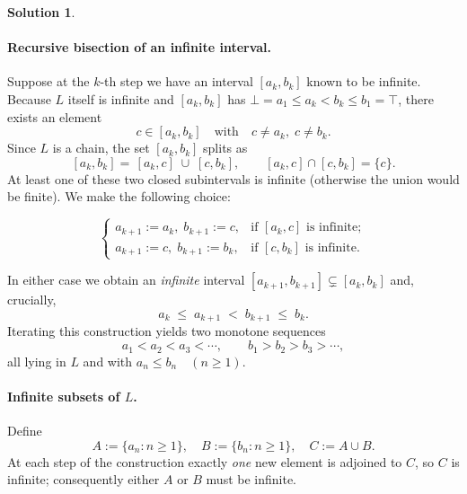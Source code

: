 \documentclass[12pt]{article}
\theoremstyle{definition} %
\newtheorem{solution}{Solution}
\theoremstyle{plain} %
\begin{document}
\begin{solution}
          \paragraph{Recursive bisection of an infinite interval.}
          Suppose at the $k$-th step we have an interval $[a_{k},b_{k}]$
          known to be infinite.
          Because $L$ itself is infinite and $[a_{k},b_{k}]$ has
          $\bot=a_{1}\le a_{k}<b_{k}\le b_{1}=\top$,
          there exists an element
          \[
          c\in [a_{k},b_{k}]
          \quad\text{with}\quad
          c\ne a_{k},\;c\ne b_{k}.
          \]
          Since $L$ is a chain, the set
          \(
          [a_{k},b_{k}]
          \)
          splits as
          \[
          [a_{k},b_{k}]
          =\,[a_{k},c]\;\cup\;[c,b_{k}],
          \qquad
          [a_{k},c]\cap[c,b_{k}]
          =\{c\}.
          \]
          At least one of these two closed subintervals is infinite
          (otherwise the union would be finite).
          We make the following choice:
          
          \[
          \begin{cases}
          a_{k+1}:=a_{k},\; b_{k+1}:=c,
          &\text{if }[a_{k},c]\text{ is infinite};\\[2pt]
          a_{k+1}:=c,\; b_{k+1}:=b_{k},
          &\text{if }[c,b_{k}]\text{ is infinite}.
          \end{cases}
          \]
          
          \noindent
          In either case we obtain an \emph{infinite} interval
          \(
          [a_{k+1},b_{k+1}]
          \subsetneq
          [a_{k},b_{k}]
          \)
          and, crucially,
          \[
          a_{k}\;\le\;a_{k+1}\;<\;b_{k+1}\;\le\;b_{k}.
          \]
          Iterating this construction yields two monotone sequences
          \[
          a_{1}<a_{2}<a_{3}<\dotsb,
          \qquad
          b_{1}>b_{2}>b_{3}>\dotsb,
          \]
          all lying in $L$ and with
          \(
          a_{n}\le b_{n}\quad(n\ge1).
          \)
          
          \medskip
          \paragraph{Infinite subsets of $L$.}
          Define
          \[
          A:=\{a_{n}:n\ge1\},\quad
          B:=\{b_{n}:n\ge1\},\quad
          C:=A\cup B.
          \]
          At each step of the construction exactly \emph{one}
          new element is adjoined to $C$, so $C$ is infinite;
          consequently either $A$ or $B$ must be infinite.
          

\end{solution}
\end{document}
